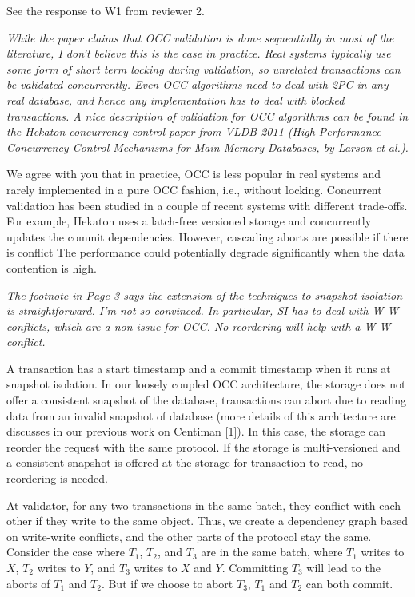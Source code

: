 \documentclass{article}
\begin{document}
See the response to W1 from reviewer 2.

\emph{While the paper claims that OCC validation is done sequentially in most of the literature, I don't believe this is the case in practice. Real systems typically use some form of short term locking during validation, so unrelated transactions can be validated concurrently. Even OCC algorithms need to deal with 2PC in any real database, and hence any implementation has to deal with blocked transactions. A nice description of validation for OCC algorithms can be found in the Hekaton concurrency control paper from VLDB 2011 (High-Performance Concurrency Control Mechanisms for Main-Memory Databases, by Larson et al.). }

We agree with you that in practice, OCC is less popular in real systems and rarely implemented in a pure OCC fashion, i.e., without locking. Concurrent validation has been studied in a couple of recent systems with different trade-offs. For example, Hekaton uses a latch-free versioned storage and concurrently updates the commit dependencies. However, cascading aborts are possible if there is conflict The performance could potentially degrade significantly when the data contention is high.

\emph{The footnote in Page 3 says the extension of the techniques to snapshot isolation is straightforward. I'm not so convinced. In particular, SI has to deal with W-W conflicts, which are a non-issue for OCC. No reordering will help with a W-W conflict.
}

A transaction has a start timestamp and a commit timestamp when it runs at snapshot isolation. In our loosely coupled OCC architecture, the storage does not offer a consistent snapshot of the database, transactions can abort due to reading data from an invalid snapshot of database (more details of this architecture are discusses in our previous work on Centiman [1]). In this case, the storage can reorder the request with the same protocol. If the storage is multi-versioned and a consistent snapshot is offered at the storage for transaction to read, no reordering is needed.

At validator, for any two transactions in the same batch, they conflict with each other if they write to the same object. Thus, we create a dependency graph based on write-write conflicts, and the other parts of the protocol stay the same. Consider the case where $T_1$, $T_2$, and $T_3$ are in the same batch, where $T_1$ writes to $X$, $T_2$ writes to $Y$, and $T_3$ writes to $X$ and $Y$. Committing $T_3$ will lead to the aborts of $T_1$ and $T_2$. But if we choose to abort $T_3$, $T_1$ and $T_2$ can both commit.
\end{document}
